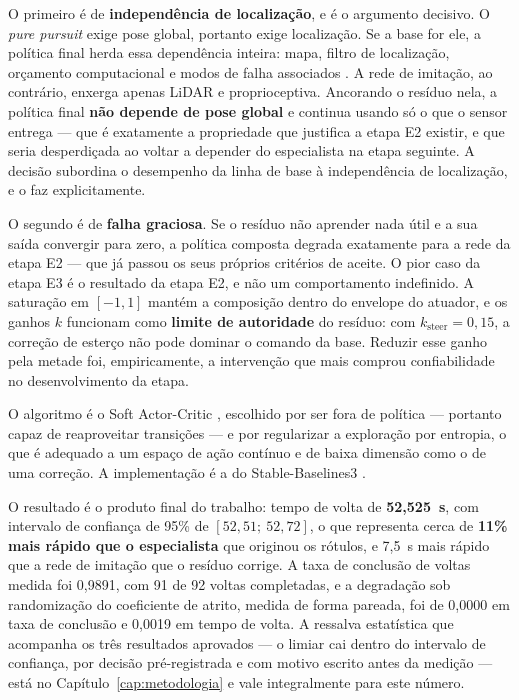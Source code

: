 O primeiro é de \textbf{independência de localização}, e é o argumento decisivo. O
\textit{pure pursuit} exige pose global, portanto exige localização. Se a base
for ele, a política final herda essa dependência inteira: mapa, filtro de
localização, orçamento computacional e modos de falha associados
\cite{fox2003adapting}. A rede de imitação, ao contrário, enxerga apenas LiDAR e
proprioceptiva. Ancorando o resíduo nela, a política final \textbf{não depende de
pose global} e continua usando só o que o sensor entrega --- que é exatamente a propriedade que
justifica a etapa E2 existir, e que seria desperdiçada ao voltar a depender do
especialista na etapa seguinte. A decisão subordina o desempenho da linha de base
à independência de localização, e o faz explicitamente.

O segundo é de \textbf{falha graciosa}. Se o resíduo não aprender nada útil e a
sua saída convergir para zero, a política composta degrada exatamente para a rede
da etapa E2 --- que já passou os seus próprios critérios de aceite. O pior caso
da etapa E3 é o resultado da etapa E2, e não um comportamento indefinido. A
saturação em $[-1, 1]$ mantém a composição dentro do envelope do atuador, e os
ganhos $k$ funcionam como \textbf{limite de autoridade} do resíduo: com
$k_{\text{steer}} = 0{,}15$, a correção de esterço não pode dominar o comando da
base. Reduzir esse ganho pela metade foi, empiricamente, a intervenção que mais
comprou confiabilidade no desenvolvimento da etapa.

O algoritmo é o Soft Actor-Critic \cite{Haarnoja2018SAC}, escolhido por ser fora
de política --- portanto capaz de reaproveitar transições --- e por regularizar a
exploração por entropia, o que é adequado a um espaço de ação contínuo e de baixa
dimensão como o de uma correção. A implementação é a do Stable-Baselines3
\cite{Raffin2021SB3}.

O resultado é o produto final do trabalho: tempo de volta de \textbf{52,525~s},
com intervalo de confiança de 95\% de $[52{,}51;\ 52{,}72]$, o que representa
cerca de \textbf{11\% mais rápido que o especialista} que originou os rótulos, e
7,5~s mais rápido que a rede de imitação que o resíduo corrige. A taxa de
conclusão de voltas medida foi 0,9891, com 91 de 92 voltas completadas, e a
degradação sob randomização do coeficiente de atrito, medida de forma pareada,
foi de 0,0000 em taxa de conclusão e 0,0019 em tempo de volta. A ressalva
estatística que acompanha os três resultados aprovados --- o limiar cai dentro do
intervalo de confiança, por decisão pré-registrada e com motivo escrito antes da
medição --- está no Capítulo~\ref{cap:metodologia} e vale integralmente para este
número.

